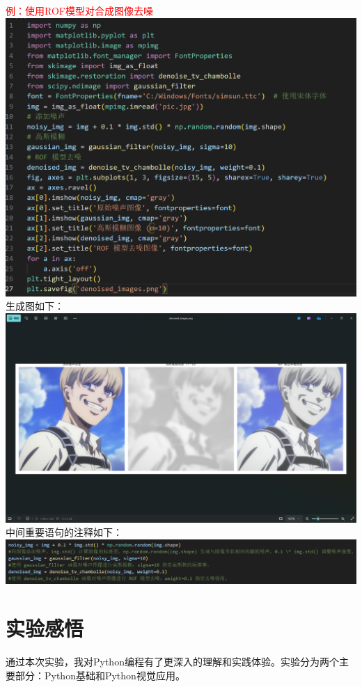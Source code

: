 \documentclass[12pt,a4paper,UTF8]{article}
\begin{document}
\begin{enumerate}
        \textcolor{red}{例：使用ROF模型对合成图像去噪}\\
        \includegraphics[scale=0.35]{pictures/17.png}\\
        生成图如下：\\
        \includegraphics[scale=0.15]{pictures/17_2.png}\\
        中间重要语句的注释如下：\\
        \includegraphics[scale=0.25]{pictures/18.png}
    \end{enumerate}
    
    \NoBgThispage
    \section{实验感悟}
    通过本次实验，我对Python编程有了更深入的理解和实践体验。实验分为两个主要部分：Python基础和Python视觉应用。
\end{document}
